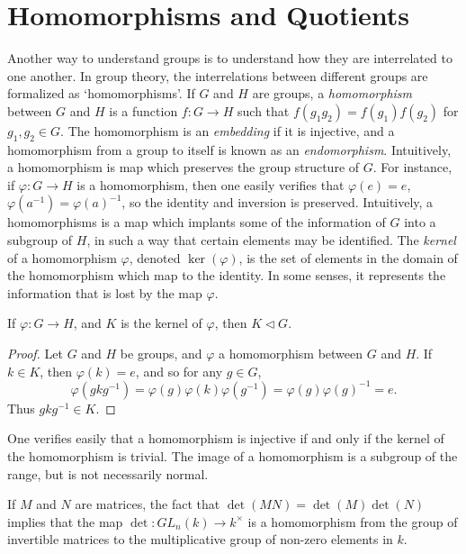 \section{Homomorphisms and Quotients}

Another way to understand groups is to understand how they are interrelated to one another. In group theory, the interrelations between different groups are formalized as `homomorphisms'. If $G$ and $H$ are groups, a \emph{homomorphism} between $G$ and $H$ is a function $f: G \to H$ such that $f(g_1g_2) = f(g_1)f(g_2)$ for $g_1, g_2 \in G$. The homomorphism is an \emph{embedding} if it is injective, and a homomorphism from a group to itself is known as an \emph{endomorphism}. Intuitively, a homomorphism is map which preserves the group structure of $G$. For instance, if $\varphi: G \to H$ is a homomorphism, then one easily verifies that $\varphi(e) = e$, $\varphi(a^{-1}) = \varphi(a)^{-1}$, so the identity and inversion is preserved. Intuitively, a homomorphisms is a map which implants some of the information of $G$ into a subgroup of $H$, in such a way that certain elements may be identified. The \emph{kernel} of a homomorphism $\varphi$, denoted $\ker(\varphi)$, is the set of elements in the domain of the homomorphism which map to the identity. In some senses, it represents the information that is lost by the map $\varphi$.

\begin{lemma} If $\varphi: G \to H$, and $K$ is the kernel of $\varphi$, then $K \lhd G$. \end{lemma}
\begin{proof}
    Let $G$ and $H$ be groups, and $\varphi$ a homomorphism between $G$ and $H$. If $k \in K$, then $\varphi(k) = e$, and so for any $g \in G$,
    \[ \varphi(gkg^{-1}) = \varphi(g) \varphi(k) \varphi(g^{-1}) = \varphi(g) \varphi(g)^{-1} = e. \]
    Thus $gkg^{-1} \in K$.
\end{proof}

One verifies easily that a homomorphism is injective if and only if the kernel of the homomorphism is trivial. The image of a homomorphism is a subgroup of the range, but is not necessarily normal.

\begin{example}
    If $M$ and $N$ are matrices, the fact that $\det(MN) = \det(M) \det(N)$ implies that the map $\det: GL_n(k) \to k^\times$ is a homomorphism from the group of invertible matrices to the multiplicative group of non-zero elements in $k$.
\end{example}

